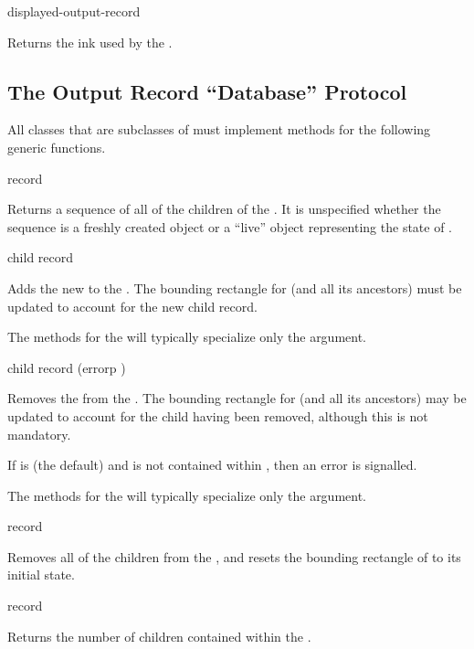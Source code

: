  {displayed-output-record}

Returns the ink used by the 
.


\subsection {The Output Record ``Database'' Protocol}

All classes that are subclasses of  must implement methods for
the following generic functions.

 {record}

Returns a sequence of all of the children of the 
.  It is unspecified whether the sequence is a freshly created
object or a ``live'' object representing the state of .

 {child record}

Adds the new   to the 
.  The bounding rectangle for  (and all its ancestors)
must be updated to account for the new child record.

The methods for the  will typically specialize only the
 argument.

 {child record \optional (errorp )}

Removes the   from the 
.  The bounding rectangle for  (and all its ancestors)
may be updated to account for the child having been removed, although this is
not mandatory.

If  is  (the default) and  is not contained
within , then an error is signalled.

The methods for the  will typically specialize only the
 argument.

 {record}

Removes all of the children from the  , and
resets the bounding rectangle of  to its initial state.

 {record}

Returns the number of children contained within the 
.


